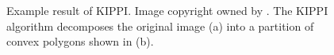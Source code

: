 \begin{figure}[!h]
	\centering
    \caption[Example result of KIPPI]{Example result of KIPPI. Image copyright owned by \cite{kippi}. The KIPPI algorithm decomposes the original image (a) into a partition of convex polygons shown in (b).}
    \label{fig:kippires}
\end{figure}